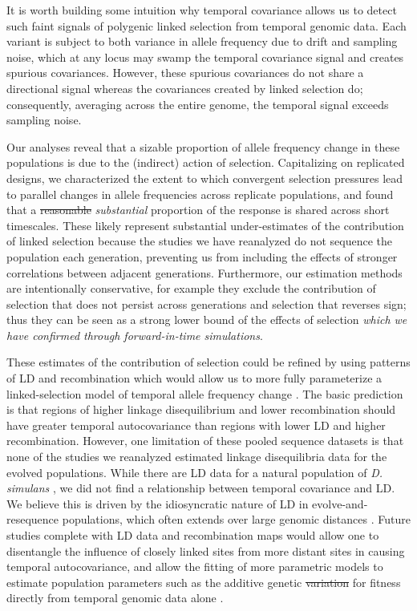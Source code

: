 \documentclass[11pt]{article}
\newcommand{\vb}[1]{{\it \color{blue} #1}}
\providecommand{\DIFaddtex}[1]{{\protect\color{blue}\uwave{#1}}} %
\providecommand{\DIFdeltex}[1]{{\protect\color{red}\sout{#1}}}                      %
\providecommand{\DIFaddbegin}{} %
\providecommand{\DIFaddend}{} %
\providecommand{\DIFdelbegin}{} %
\providecommand{\DIFdelend}{} %
\providecommand{\DIFadd}[1]{\texorpdfstring{\DIFaddtex{#1}}{#1}} %
\providecommand{\DIFdel}[1]{\texorpdfstring{\DIFdeltex{#1}}{}} %
\begin{document}
It is worth building some intuition why temporal covariance allows us to detect
such faint signals of polygenic linked selection from temporal genomic data.
Each variant is subject to both variance in allele frequency due to drift and
sampling noise, which at any locus may swamp the temporal covariance signal and
creates spurious covariances. However, these spurious covariances do not share
a directional signal whereas the covariances created by linked selection do;
consequently, averaging across the entire genome, the temporal signal exceeds
sampling noise. 

Our analyses reveal that a sizable proportion of allele frequency change in
these populations is due to the (indirect) action of selection. Capitalizing on
replicated designs, we characterized the extent to which convergent selection
pressures lead to parallel changes in allele frequencies across replicate
populations, and found that a \DIFdelbegin \DIFdel{reasonable }\DIFdelend \DIFaddbegin \vb{substantial} \DIFaddend proportion of the response is
shared across short timescales. These likely represent substantial
under-estimates of the contribution of linked selection because the studies we
have reanalyzed do not sequence the population each generation, preventing us
from including the effects of stronger correlations between adjacent
generations.  Furthermore, our estimation methods are intentionally
conservative, for example they exclude the contribution of selection that does
not persist across generations and selection that reverses sign; thus they can
be seen as a strong lower bound of the effects of selection\DIFaddbegin \DIFadd{, }\vb{which we have
  confirmed through forward-in-time simulations}\DIFaddend .

These estimates of the contribution of selection could be refined by using
patterns of LD and recombination which would allow us to more fully
parameterize a linked-selection model of temporal allele frequency change
\parencite{Buffalo2019-io}. The basic prediction is that regions of higher
linkage disequilibrium and lower recombination should have greater temporal
autocovariance than regions with lower LD and higher recombination. However,
one limitation of these pooled sequence datasets is that none of the studies we
reanalyzed estimated linkage disequilibria data for the evolved populations.
While there are LD data for a natural population of \emph{D. simulans}
\parencite{Signor2018-wg,Howie2018-ay},  we did not find a relationship between
temporal covariance and LD.  We believe this is driven by the idiosyncratic
nature of LD in evolve-and-resequence populations, which often extends over
large genomic distances \parencite{Nuzhdin2013-gf,Kelly2019-dc}. Future studies
complete with LD data and recombination maps would allow one to disentangle the
influence of closely linked sites from more distant sites in causing temporal
autocovariance, and allow the fitting of more parametric models to estimate
population parameters such as the additive genetic \DIFdelbegin \DIFdel{variation }\DIFdelend \DIFaddbegin \DIFadd{variance }\DIFaddend for fitness
directly from temporal genomic data alone \parencite{Buffalo2019-io}.
\end{document}
